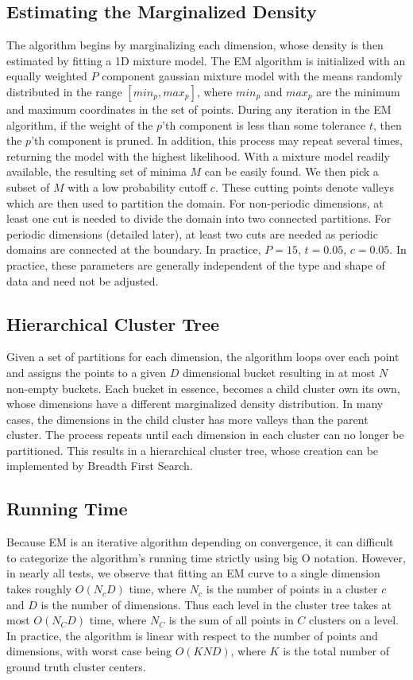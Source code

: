 \documentclass{acm_proc_article-sp}
\begin{document}
\subsection{Estimating the Marginalized Density}
The algorithm begins by marginalizing each dimension, whose density is then estimated by fitting a 1D mixture model. The EM algorithm is initialized with an equally weighted $P$ component gaussian mixture model with the means randomly distributed in the range $[min_p, max_p]$, where $min_p$ and $max_p$ are the minimum and maximum coordinates in the set of points. During any iteration in the EM algorithm, if the weight of the $p$'th component is less than some tolerance $t$, then the $p$'th component is pruned. In addition, this process may repeat several times, returning the model with the highest likelihood. With a mixture model readily available, the resulting set of minima $M$ can be easily found. We then pick a subset of $M$ with a low probability cutoff $c$. These cutting points denote valleys which are then used to partition the domain. For non-periodic dimensions, at least one cut is needed to divide the domain into two connected partitions. For periodic dimensions (detailed later), at least two cuts are needed as periodic domains are connected at the boundary. In practice, $P=15$, $t=0.05$, $c=0.05$. In practice, these parameters are generally independent of the type and shape of data and need not be adjusted. 

\subsection{Hierarchical Cluster Tree}
 Given a set of partitions for each dimension, the algorithm loops over each point and assigns the points to a given $D$ dimensional bucket resulting in at most $N$ non-empty buckets. Each bucket in essence, becomes a child cluster own its own, whose dimensions have a different marginalized density distribution. In many cases, the dimensions in the child cluster has more valleys than the parent cluster. The process repeats until each dimension in each cluster can no longer be partitioned. This results in a hierarchical cluster tree, whose creation can be implemented by Breadth First Search.

\subsection{Running Time}

Because EM is an iterative algorithm depending on convergence, it can difficult to categorize the algorithm's running time strictly using big O notation. However, in nearly all tests, we observe that fitting an EM curve to a single dimension takes roughly $O(N_c D)$ time, where $N_c$ is the number of points in a cluster $c$ and $D$ is the number of dimensions. Thus each level in the cluster tree takes at most $O(N_C D)$ time, where $N_C$ is the sum of all points in $C$ clusters on a level. In practice, the algorithm is linear with respect to the number of points and dimensions, with worst case being $O(K N D)$, where $K$ is the total number of ground truth cluster centers. 
\end{document}
